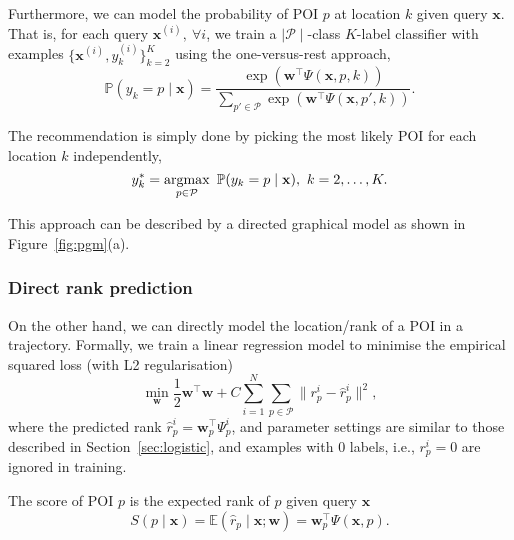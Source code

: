 Furthermore, we can model the probability of POI $p$ at location $k$ given query $\mathbf{x}$.
That is, for each query $\mathbf{x}^{(i)},~ \forall i$, 
we train a $\mid\!\! \mathcal{P} \!\!\mid$-class $K$-label classifier with examples $\{ \mathbf{x}^{(i)}, y_k^{(i)} \}_{k=2}^K$
using the one-versus-rest approach,
\begin{equation*}
\mathbb{P}(y_k = p \mid \mathbf{x}) = \frac{\exp \left( \mathbf{w}^\top \Psi(\mathbf{x}, p, k) \right)}
                                           {\sum_{p' \in \mathcal{P}} \exp \left( \mathbf{w}^\top \Psi(\mathbf{x}, p', k) \right)}.
\end{equation*}

The recommendation is simply done by picking the most likely POI for each location $k$ independently,
\begin{equation*}
y_k^* = \operatorname*{argmax}_{p \in \mathcal{P}}~ \mathbb{P}(y_k = p \mid \mathbf{x}),~ k = 2, \dots, K.
\end{equation*}

This approach can be described by a directed graphical model as shown in Figure~\ref{fig:pgm}(a).



\subsubsection{Direct rank prediction}
\label{sec:linear}

On the other hand, we can directly model the location/rank of a POI in a trajectory.
Formally, we train a linear regression model to minimise the empirical squared loss (with L2 regularisation)
\begin{equation*}
\min_{\mathbf{w}} \frac{1}{2} \mathbf{w}^\top \mathbf{w} + C \sum_{i=1}^N \sum_{p \in \mathcal{P}} \|r_p^i - \hat{r}_p^i \|^2, 
\end{equation*}
where the predicted rank $\hat{r}_p^i = \mathbf{w}_p^\top \Psi_p^i$, 
and parameter settings are similar to those described in Section~\ref{sec:logistic},
and examples with $0$ labels, i.e., $r_p^i = 0$ are ignored in training.

The score of POI $p$ is the expected rank of $p$ given query $\mathbf{x}$ 
\begin{equation*}
S(p \mid \mathbf{x})
= \mathbb{E}(\hat{r}_p \mid \mathbf{x}; \mathbf{w}) 
= \mathbf{w}_p^\top \Psi(\mathbf{x}, p).
\end{equation*}


